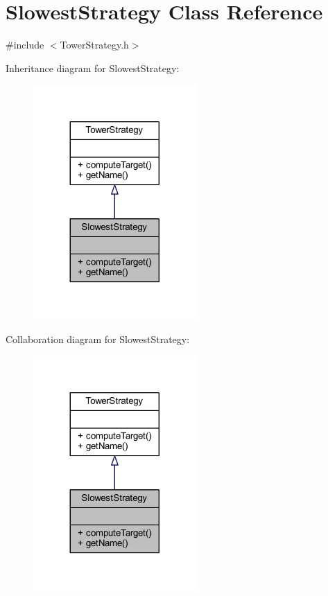 \hypertarget{class_slowest_strategy}{\section{Slowest\+Strategy Class Reference}
\label{class_slowest_strategy}
}


{\ttfamily \#include $<$Tower\+Strategy.\+h$>$}



Inheritance diagram for Slowest\+Strategy\+:\nopagebreak
\begin{figure}[H]
\begin{center}
\leavevmode
\includegraphics[width=176pt]{class_slowest_strategy__inherit__graph}
\end{center}
\end{figure}


Collaboration diagram for Slowest\+Strategy\+:\nopagebreak
\begin{figure}[H]
\begin{center}
\leavevmode
\includegraphics[width=176pt]{class_slowest_strategy__coll__graph}
\end{center}
\end{figure}
